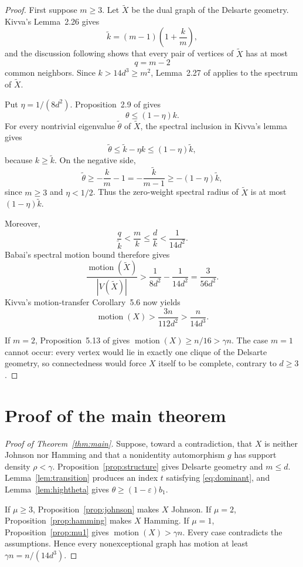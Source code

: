 \documentclass[11pt]{amsart}
\theoremstyle{definition}
\newcommand{\mot}{\operatorname{motion}}
\newcommand{\eps}{\varepsilon}
\newcommand{\gam}{\gamma}
\begin{document}
\begin{proof}
First suppose $m\ge3$.  Let $\widetilde X$ be the dual graph of the Delsarte geometry.  Kivva's Lemma~2.26 gives
\begin{equation}\label{eq:dualdegree}
 \widetilde k=(m-1)\left(1+\frac{k}{m}\right),
\end{equation}
and the discussion following \cite[Lemma~5.1]{Kivva} shows that every pair of vertices of $\widetilde X$ has at most
\[
 q=m-2
\]
common neighbors.  Since $k>14d^3\ge m^2$, Lemma~2.27 of \cite{Kivva} applies to the spectrum of $\widetilde X$.

Put $\eta=1/(8d^2)$.  Proposition~2.9 of \cite{PS} gives
\[
 \theta\le(1-\eta)k.
\]
For every nontrivial eigenvalue $\widetilde\theta$ of $\widetilde X$, the spectral inclusion in Kivva's lemma gives
\[
 \widetilde\theta\le\widetilde k-\eta k\le(1-\eta)\widetilde k,
\]
because $k\ge\widetilde k$.  On the negative side,
\[
 \widetilde\theta\ge-\frac{k}{m}-1=-\frac{\widetilde k}{m-1}
 \ge-(1-\eta)\widetilde k,
\]
since $m\ge3$ and $\eta<1/2$.  Thus the zero-weight spectral radius of $\widetilde X$ is at most $(1-\eta)\widetilde k$.

Moreover,
\[
 \frac q{\widetilde k}<\frac{m}{k}\le\frac d{k}<\frac1{14d^2}.
\]
Babai's spectral motion bound therefore gives
\[
 \frac{\mot(\widetilde X)}{|V(\widetilde X)|}
 >\frac1{8d^2}-\frac1{14d^2}
 =\frac3{56d^2}.
\]
Kivva's motion-transfer Corollary~5.6 now yields
\[
 \mot(X)>\frac{3n}{112d^2}>\frac{n}{14d^3}.
\]

If $m=2$, Proposition~5.13 of \cite{Kivva} gives $\mot(X)\ge n/16>\gam n$.  The case $m=1$ cannot occur: every vertex would lie in exactly one clique of the Delsarte geometry, so connectedness would force $X$ itself to be complete, contrary to $d\ge3$.
\end{proof}

\section{Proof of the main theorem}
\begin{proof}[Proof of Theorem~\ref{thm:main}]
Suppose, toward a contradiction, that $X$ is neither Johnson nor Hamming and that a nonidentity automorphism $g$ has support density $\rho<\gam$.  Proposition~\ref{prop:structure} gives Delsarte geometry and $m\le d$.  Lemma~\ref{lem:transition} produces an index $t$ satisfying \eqref{eq:dominant}, and Lemma~\ref{lem:hightheta} gives $\theta\ge(1-\eps)b_1$.

If $\mu\ge3$, Proposition~\ref{prop:johnson} makes $X$ Johnson.  If $\mu=2$, Proposition~\ref{prop:hamming} makes $X$ Hamming.  If $\mu=1$, Proposition~\ref{prop:mu1} gives $\mot(X)>\gam n$.  Every case contradicts the assumptions.  Hence every nonexceptional graph has motion at least $\gam n=n/(14d^3)$.
\end{proof}
\end{document}
